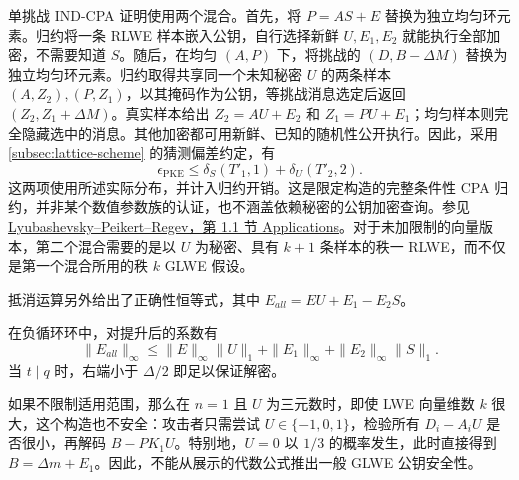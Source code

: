 单挑战 IND-CPA 证明使用两个混合。首先，将 $P=AS+E$ 替换为独立均匀环元素。归约将一条 RLWE 样本嵌入公钥，自行选择新鲜 $U,E_1,E_2$ 就能执行全部加密，不需要知道 $S$。随后，在均匀 $(A,P)$ 下，将挑战的 $(D,B-\Delta M)$ 替换为独立均匀环元素。归约取得共享同一个未知秘密 $U$ 的两条样本 $(A,Z_2),(P,Z_1)$，以其掩码作为公钥，等挑战消息选定后返回 $(Z_2,Z_1+\Delta M)$。真实样本给出 $Z_2=AU+E_2$ 和 $Z_1=PU+E_1$；均匀样本则完全隐藏选中的消息。其他加密都可用新鲜、已知的随机性公开执行。因此，采用 \autoref{subsec:lattice-scheme} 的猜测偏差约定，有
\[
\epsilon_{\mathrm{PKE}}\le\delta_S(T'_1,1)+\delta_U(T'_2,2).
\]
这两项使用所述实际分布，并计入归约开销。这是限定构造的完整条件性 CPA 归约，并非某个数值参数族的认证，也不涵盖依赖秘密的公钥加密查询。参见 \href{https://web.eecs.umich.edu/~cpeikert/pubs/ideal-lwe.pdf}{Lyubashevsky--Peikert--Regev，第 1.1 节 Applications}。对于未加限制的向量版本，第二个混合需要的是以 $U$ 为秘密、具有 $k+1$ 条样本的秩一 RLWE，而不仅是第一个混合所用的秩 $k$ GLWE 假设。

抵消运算另外给出了正确性恒等式，其中 $E_{\mathit{all}}=EU+E_1-E_2S$。

在负循环环中，对提升后的系数有
\[
\|E_{\mathit{all}}\|_\infty\le\|E\|_\infty\|U\|_1+\|E_1\|_\infty+\|E_2\|_\infty\|S\|_1.
\]
当 $t\mid q$ 时，右端小于 $\Delta/2$ 即足以保证解密。

如果不限制适用范围，那么在 $n=1$ 且 $U$ 为三元数时，即使 LWE 向量维数 $k$ 很大，这个构造也不安全：攻击者只需尝试 $U\in\{-1,0,1\}$，检验所有 $D_i-A_iU$ 是否很小，再解码 $B-\mathit{PK}_1U$。特别地，$U=0$ 以 $1/3$ 的概率发生，此时直接得到 $B=\Delta m+E_1$。因此，不能从展示的代数公式推出一般 GLWE 公钥安全性。
